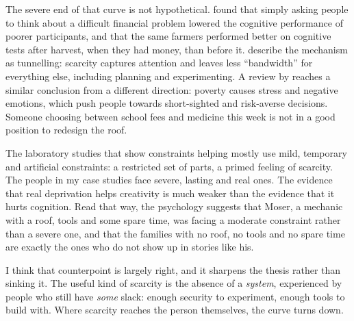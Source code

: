 The severe end of that curve is not hypothetical. \textcite{mani2013} found
that simply asking people to think about a difficult financial problem lowered
the cognitive performance of poorer participants, and that the same farmers
performed better on cognitive tests after harvest, when they had money, than
before it. \textcite{mullainathan2013} describe the mechanism as tunnelling:
scarcity captures attention and leaves less ``bandwidth'' for everything else,
including planning and experimenting. A review by \textcite{haushofer2014}
reaches a similar conclusion from a different direction: poverty causes stress
and negative emotions, which push people towards short-sighted and risk-averse
decisions. Someone choosing between school fees and medicine this week is not
in a good position to redesign the roof.

\begin{counterpoint}
The laboratory studies that show constraints helping mostly use mild,
temporary and artificial constraints: a restricted set of parts, a primed
feeling of scarcity. The people in my case studies face severe, lasting and
real ones. The evidence that real deprivation helps creativity is much weaker
than the evidence that it hurts cognition. Read that way, the psychology
suggests that Moser, a mechanic with a roof, tools and some spare time, was
facing a moderate constraint rather than a severe one, and that the families
with no roof, no tools and no spare time are exactly the ones who do not show
up in stories like his.
\end{counterpoint}

I think that counterpoint is largely right, and it sharpens the thesis rather
than sinking it. The useful kind of scarcity is the absence of a \emph{system},
experienced by people who still have \emph{some} slack: enough security to
experiment, enough tools to build with. Where scarcity reaches the person
themselves, the curve turns down.
